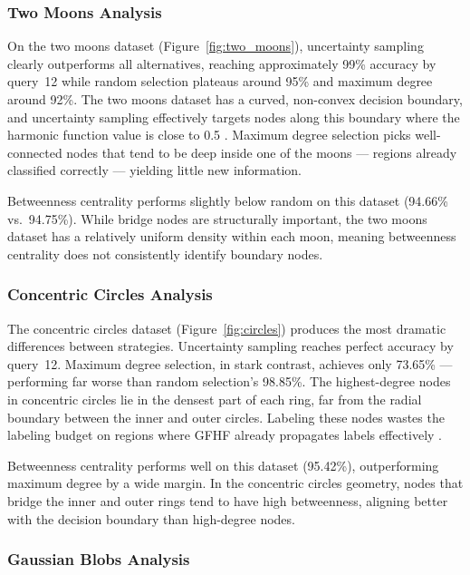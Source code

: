 \documentclass[12pt]{article}
\begin{document}
\subsubsection{Two Moons Analysis}

On the two moons dataset (Figure~\ref{fig:two_moons}), uncertainty sampling \cite{Lewis1994} clearly outperforms all alternatives, reaching approximately 99\% accuracy by query~12 while random selection plateaus around 95\% and maximum degree around 92\%. The two moons dataset has a curved, non-convex decision boundary, and uncertainty sampling effectively targets nodes along this boundary where the harmonic function value is close to 0.5 \cite{Zhu2003}. Maximum degree selection picks well-connected nodes that tend to be deep inside one of the moons --- regions already classified correctly --- yielding little new information.

Betweenness centrality \cite{Freeman1977} performs slightly below random on this dataset (94.66\% vs.\ 94.75\%). While bridge nodes are structurally important, the two moons dataset has a relatively uniform density within each moon, meaning betweenness centrality does not consistently identify boundary nodes.

\subsubsection{Concentric Circles Analysis}

The concentric circles dataset (Figure~\ref{fig:circles}) produces the most dramatic differences between strategies. Uncertainty sampling reaches perfect accuracy by query~12. Maximum degree selection, in stark contrast, achieves only 73.65\% --- performing far worse than random selection's 98.85\%. The highest-degree nodes in concentric circles lie in the densest part of each ring, far from the radial boundary between the inner and outer circles. Labeling these nodes wastes the labeling budget on regions where GFHF already propagates labels effectively \cite{Zhu2003}.

Betweenness centrality performs well on this dataset (95.42\%), outperforming maximum degree by a wide margin. In the concentric circles geometry, nodes that bridge the inner and outer rings tend to have high betweenness, aligning better with the decision boundary than high-degree nodes.

\subsubsection{Gaussian Blobs Analysis}
\end{document}
